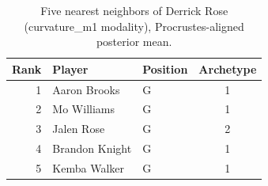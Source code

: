 \begin{table}[htbp]
  \centering\small
  \begin{tabular}{rllc}
    \toprule
    Rank & Player & Position & Archetype \\
    \midrule
    1 & Aaron Brooks & G & 1 \\
    2 & Mo Williams & G & 1 \\
    3 & Jalen Rose & G & 2 \\
    4 & Brandon Knight & G & 1 \\
    5 & Kemba Walker & G & 1 \\
    \bottomrule
  \end{tabular}
  \caption{Five nearest neighbors of Derrick Rose (curvature_m1 modality), Procrustes-aligned posterior mean.}
  \label{tab:Derrick_Rose_neighbors_curvature_m1}
\end{table}


